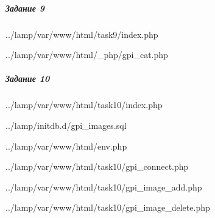 
\subparagraph{Задание 9} \hspace{0pt}


{../lamp/var/www/html/task9/index.php}


{../lamp/var/www/html/_php/gpi_cat.php}


\subparagraph{Задание 10} \hspace{0pt}


{../lamp/var/www/html/task10/index.php}


{../lamp/initdb.d/gpi_images.sql}


{../lamp/var/www/html/env.php}


{../lamp/var/www/html/task10/gpi_connect.php}


{../lamp/var/www/html/task10/gpi_image_add.php}


{../lamp/var/www/html/task10/gpi_image_delete.php}
